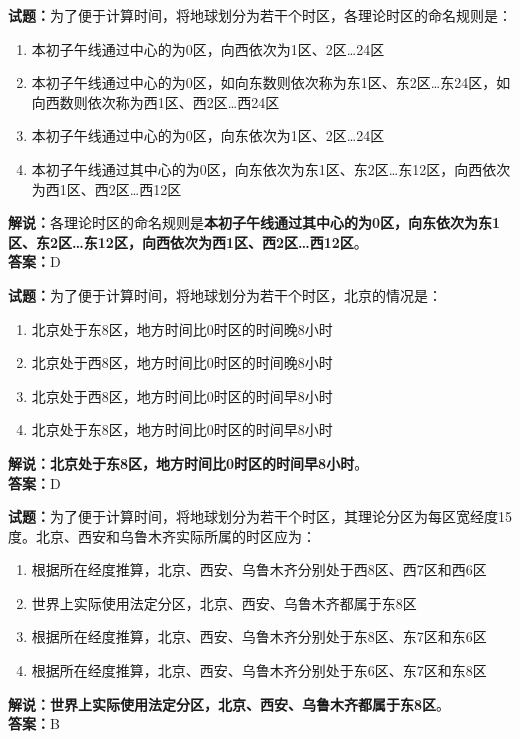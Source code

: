 \documentclass{ctexbook}
\begin{document}
\textbf{试题：}为了便于计算时间，将地球划分为若干个时区，各理论时区的命名规则是：
\begin{enumerate}[leftmargin=3em]
  \item 本初子午线通过中心的为0区，向西依次为1区、2区…24区
  \item 本初子午线通过中心的为0区，如向东数则依次称为东1区、东2区…东24区，如向西数则依次称为西1区、西2区…西24区
  \item 本初子午线通过中心的为0区，向东依次为1区、2区…24区
  \item 本初子午线通过其中心的为0区，向东依次为东1区、东2区…东12区，向西依次为西1区、西2区…西12区
\end{enumerate}
\noindent\textbf{解说：}各理论时区的命名规则是\textbf{本初子午线通过其中心的为0区，向东依次为东1区、东2区…东12区，向西依次为西1区、西2区…西12区}。\\\noindent\textbf{答案：}D

\vspace{1em}

\textbf{试题：}为了便于计算时间，将地球划分为若干个时区，北京的情况是：
\begin{enumerate}[leftmargin=3em]
  \item 北京处于东8区，地方时间比0时区的时间晚8小时
  \item 北京处于西8区，地方时间比0时区的时间晚8小时
  \item 北京处于西8区，地方时间比0时区的时间早8小时
  \item 北京处于东8区，地方时间比0时区的时间早8小时
\end{enumerate}
\noindent\textbf{解说：}\textbf{北京处于东8区，地方时间比0时区的时间早8小时}。\\\noindent\textbf{答案：}D

\vspace{1em}

\textbf{试题：}为了便于计算时间，将地球划分为若干个时区，其理论分区为每区宽经度15度。北京、西安和乌鲁木齐实际所属的时区应为：
\begin{enumerate}[leftmargin=3em]
  \item 根据所在经度推算，北京、西安、乌鲁木齐分别处于西8区、西7区和西6区
  \item 世界上实际使用法定分区，北京、西安、乌鲁木齐都属于东8区
  \item 根据所在经度推算，北京、西安、乌鲁木齐分别处于东8区、东7区和东6区
  \item 根据所在经度推算，北京、西安、乌鲁木齐分别处于东6区、东7区和东8区
\end{enumerate}
\noindent\textbf{解说：}\textbf{世界上实际使用法定分区，北京、西安、乌鲁木齐都属于东8区}。\\\noindent\textbf{答案：}B
\end{document}
